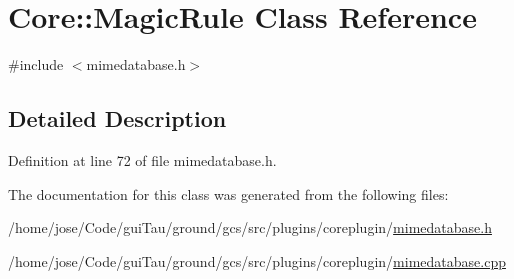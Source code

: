 \hypertarget{class_core_1_1_magic_rule}{\section{Core\-:\-:Magic\-Rule Class Reference}
\label{class_core_1_1_magic_rule}
}


{\ttfamily \#include $<$mimedatabase.\-h$>$}



\subsection{Detailed Description}


Definition at line 72 of file mimedatabase.\-h.



The documentation for this class was generated from the following files\-:\begin{DoxyCompactItemize}
\item 
/home/jose/\-Code/gui\-Tau/ground/gcs/src/plugins/coreplugin/\hyperlink{mimedatabase_8h}{mimedatabase.\-h}\item 
/home/jose/\-Code/gui\-Tau/ground/gcs/src/plugins/coreplugin/\hyperlink{mimedatabase_8cpp}{mimedatabase.\-cpp}\end{DoxyCompactItemize}
